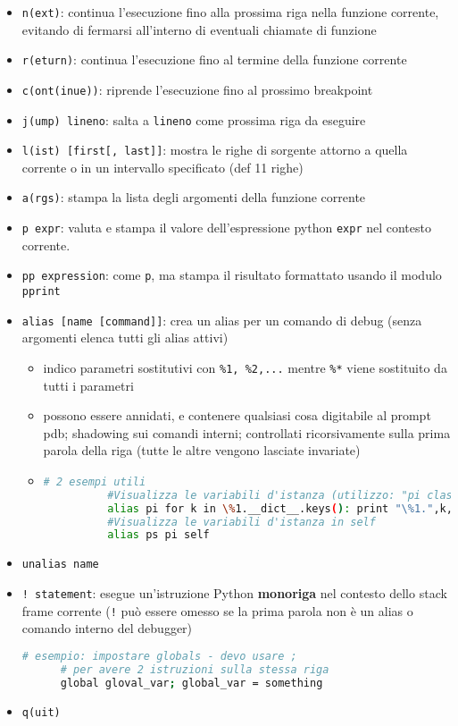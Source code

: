 \begin{itemize}
  \item \texttt{n(ext)}: continua l'esecuzione fino alla prossima riga nella funzione corrente, evitando di fermarsi all'interno di eventuali chiamate di funzione
  \item \texttt{r(eturn)}: continua l'esecuzione fino al termine della funzione corrente
  \item \texttt{c(ont(inue))}: riprende l'esecuzione fino al prossimo breakpoint
  \item \texttt{j(ump) lineno}: salta a \texttt{lineno} come prossima riga da eseguire
  \item \texttt{l(ist) [first[, last]]}: mostra le righe di sorgente attorno a quella corrente o in un intervallo specificato (def 11 righe)
  \item \texttt{a(rgs)}: stampa la lista degli argomenti della funzione corrente
  \item \texttt{p expr}: valuta e stampa il valore dell'espressione python \texttt{expr} nel contesto corrente.
  \item \texttt{pp expression}: come \texttt{p}, ma stampa il risultato formattato usando il modulo \texttt{pprint}
  \item \texttt{alias [name [command]]}: crea un alias per un comando di debug (senza argomenti elenca tutti gli alias attivi)
    \begin{itemize}
      \item indico parametri sostitutivi con \texttt{\%1, \%2,...} mentre \texttt{\%*} viene sostituito da tutti i parametri
      \item possono essere annidati, e contenere qualsiasi cosa digitabile al prompt pdb; shadowing sui comandi interni; controllati ricorsivamente sulla prima parola della riga (tutte le altre vengono lasciate invariate)
      \item \begin{lstlisting}[language=bash]
          # 2 esempi utili
          #Visualizza le variabili d'istanza (utilizzo: "pi classInst")
          alias pi for k in \%1.__dict__.keys(): print "\%1.",k,"=",\%1.__dict__[k]
          #Visualizza le variabili d'istanza in self
          alias ps pi self
        \end{lstlisting}
    \end{itemize}
  \item \texttt{unalias name}
  \item \texttt{! statement}: esegue un'istruzione Python \textbf{monoriga} nel contesto dello stack frame corrente (\texttt{!} pu\`o essere omesso se la prima parola non \`e un alias o comando interno del debugger)
    \begin{lstlisting}[language=bash]
      # esempio: impostare globals - devo usare ;
      # per avere 2 istruzioni sulla stessa riga
      global gloval_var; global_var = something
    \end{lstlisting}
  \item \texttt{q(uit)}
\end{itemize}

